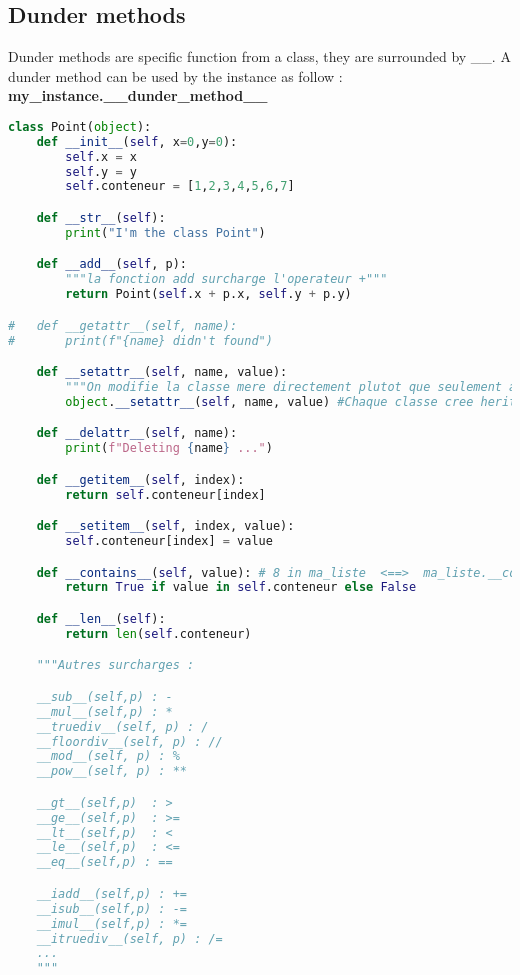 \documentclass[a4paper, 12pt]{article}
\begin{document}
\subsection{Dunder methods}
Dunder methods are specific function from a class, they are surrounded by \_\_. A dunder method can be used by the instance as follow :\\ \textbf{my\_instance.\_\_dunder\_method\_\_}
\begin{lstlisting}[language=Python]
class Point(object):
	def __init__(self, x=0,y=0):
		self.x = x
		self.y = y
		self.conteneur = [1,2,3,4,5,6,7]

	def __str__(self):
		print("I'm the class Point")

	def __add__(self, p):
		"""la fonction add surcharge l'operateur +"""
		return Point(self.x + p.x, self.y + p.y)

#	def __getattr__(self, name):
#		print(f"{name} didn't found")

	def __setattr__(self, name, value):
		"""On modifie la classe mere directement plutot que seulement appeler setaatr de cette classe et tourner en boucle sur la meme methode"""
		object.__setattr__(self, name, value) #Chaque classe cree herite de base de la classe object

	def __delattr__(self, name):
		print(f"Deleting {name} ...")

	def __getitem__(self, index):
		return self.conteneur[index]

	def __setitem__(self, index, value):
		self.conteneur[index] = value

	def __contains__(self, value): # 8 in ma_liste  <==>  ma_liste.__contains__(8)
		return True if value in self.conteneur else False

	def __len__(self):
		return len(self.conteneur)

	"""Autres surcharges : 

	__sub__(self,p) : -
	__mul__(self,p) : *
	__truediv__(self, p) : /
	__floordiv__(self, p) : //
	__mod__(self, p) : %
	__pow__(self, p) : **

	__gt__(self,p)  : >
	__ge__(self,p) 	: >=
	__lt__(self,p)  : <
	__le__(self,p)  : <=
	__eq__(self,p) : == 

	__iadd__(self,p) : +=
	__isub__(self,p) : -=
	__imul__(self,p) : *=
	__itruediv__(self, p) : /=	
	...
	"""
\end{lstlisting}
\end{document}
